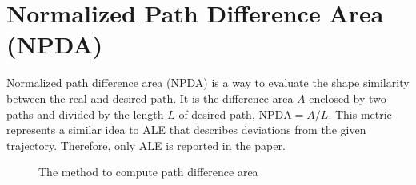 \section{Normalized Path Difference Area (NPDA)}

Normalized path difference area (NPDA)\cite{mao2017segment,su2020survey} 
is a way to evaluate the shape similarity between the real and desired path. 
It is the difference area $A$ enclosed by two paths and 
divided by the length $L$ of desired path, $\text{NPDA} = A/L$.
This metric represents a similar idea to ALE that describes deviations from the 
given trajectory. Therefore, only ALE is reported in the paper.

\begin{figure}[H]
  \begin{minipage}{\textwidth}
    \centering
    \vspace*{-7pt}
    \caption{The method to compute path difference area \label{fig:pda}}
  \end{minipage}  
  \vspace*{-1.5em}
\end{figure}

